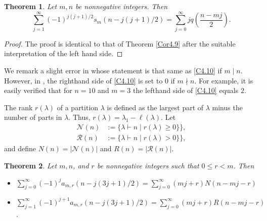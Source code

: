 \documentclass{amsart}
\newtheorem{theorem}{Theorem}[section]
\theoremstyle{definition}
\begin{document}
\begin{theorem}{\cite[Corollary 4.10]{M23}} \label{Cor4.10} Let $m, n$ be nonnegative integers. Then \begin{equation} \label{C4.10} \sum_{j=1}^\infty (-1)^{j(j+1)/2} s_{m}(n-j(j+1)/2)= \sum_{j=0}^\infty jq\left(\frac{n-mj}{2}\right).\end{equation}
\end{theorem}
\begin{proof}The proof is identical to that of Theorem \ref{Cor4.9} after the suitable interpretation of the left hand side.
\end{proof}
We remark a slight error in  \cite[Corollary 2.13]{MS} whose statement is that same as \eqref{C4.10} if $m\mid n$. However,  in \cite[Corollary 2.13]{MS},  the righthand side of \eqref{C4.10} is set to $0$ if $m\nmid n$. For example,  it is easily verified that for $n=10$ and $m=3$ the lefthand side of \eqref{C4.10} equals $2$. 
\smallskip 

The rank $r(\lambda)$ of a partition $\lambda$ is defined \cite{D} as the largest part of $\lambda$ minus the number of parts in $\lambda$. Thus, $r(\lambda)=\lambda_1-\ell(\lambda)$. Let \begin{align*}\mathcal N(n)&:=\{\lambda \vdash n \mid r(\lambda)\geq 0\}\},\\ \mathcal R(n)&:=\{\lambda \vdash n \mid r(\lambda)> 0\}\},
\end{align*} and define $N(n)=|\mathcal N(n)|$ and $R(n)=|\mathcal R(n)|$.
\begin{theorem}{\cite[Corollary 5.2]{M23}} \label{Cor5.2} Let $m,n$, and $r$ be nonnegative integers such that $0\leq r<m$. Then 
\begin{itemize}\item[(i)] $\displaystyle \sum_{j=0}^\infty (-1)^{j} a_{m,r}(n-j(3j+1)/2)= \sum_{j=0}^\infty (mj+r)N(n-mj-r)$
\item[(ii)] $\displaystyle \sum_{j=1}^\infty (-1)^{j+1} a_{m,r}(n-j(3j+1)/2)= \sum_{j=0}^\infty (mj+r)R(n-mj-r)$.
\end{itemize}
\end{theorem}
\end{document}
